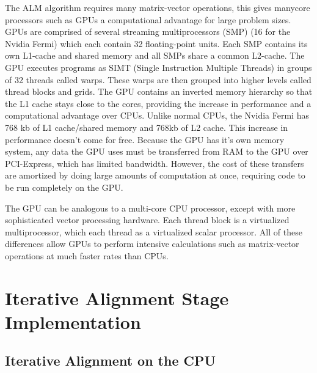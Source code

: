 \documentclass[10pt,twocolumn,letterpaper]{article}
\begin{document}
The ALM algorithm requires many matrix-vector operations, this gives manycore processors such as GPUs a computational advantage for large problem sizes.  GPUs are comprised of several streaming multiprocessors (SMP) (16 for the Nvidia Fermi) which each contain 32 floating-point units.  Each SMP contains its own L1-cache and shared memory and all SMPs share a common L2-cache.  The GPU executes programs as SIMT (Single Instruction Multiple Threads) in groups of 32 threads called warps.  These warps are then grouped into higher levels called thread blocks and grids. The GPU contains an inverted memory hierarchy so that the L1 cache stays close to the cores, providing the increase in performance and a computational advantage over CPUs.  Unlike normal CPUs, the Nvidia Fermi has 768 kb of L1 cache/shared memory and 768kb of L2 cache.  This increase in performance doesn't come for free.  Because the GPU has it's own memory system, any data the GPU uses must be transferred from RAM to the GPU over PCI-Express, which has limited bandwidth.  However, the cost of these transfers are amortized by doing large amounts of computation at once, requiring code to be run completely on the GPU.  

The GPU can be analogous to a multi-core CPU processor, except with more sophisticated vector processing hardware.  Each thread block is a virtualized multiprocessor, which each thread as a virtualized scalar processor.  All of these differences allow GPUs to perform intensive calculations such as matrix-vector operations at much faster rates than CPUs. 


\section{Iterative Alignment Stage Implementation}

\subsection{Iterative Alignment on the CPU}
\end{document}
